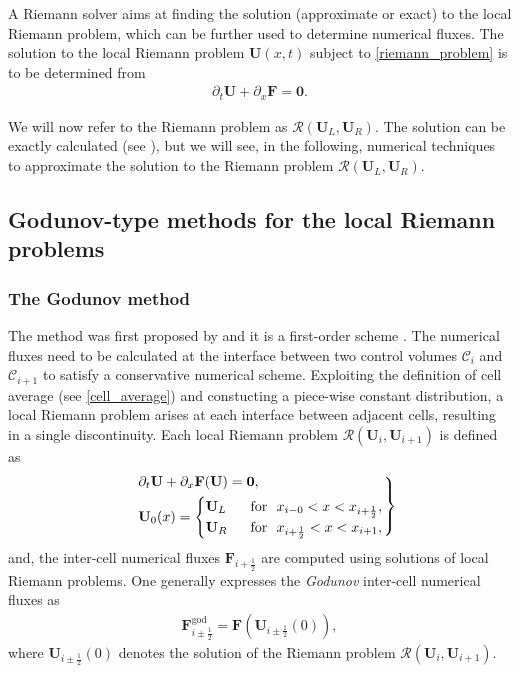 \documentclass[a4paper]{article}
\numberwithin{equation}{section}
\begin{document}
	A Riemann solver aims at finding the solution (approximate or exact) to the local Riemann problem, which can be further used to determine numerical fluxes. The solution to the local Riemann problem $\mathbf{U}(x,t)$ subject to \ref{riemann_problem} is to be determined from
	\begin{align}
		 \partial_t \mathbf{U}+\partial_x\mathbf{F} = \mathbf{0}.
	\end{align}
 
	We will now refer to the Riemann problem as $\mathcal{R}(\mathbf{U}_L,\mathbf{U}_R)$. The solution can be exactly calculated (see \cite{castro2019,toro2013,leveque_2002}), but we will see, in the following, numerical techniques to approximate the solution to the Riemann problem  $\mathcal{R}(\mathbf{U}_L,\mathbf{U}_R)$.

	\subsection{Godunov-type methods for the local Riemann problems}
	\subsubsection{The Godunov method}\label{godunov_method}
	The method was first proposed by \cite{godunov1959} and it is a first-order scheme \parencite{toro2013}. The numerical fluxes need to be calculated at the interface between two control volumes $\mathcal{C}_{i}$ and $\mathcal{C}_{i+1}$ to satisfy a conservative numerical scheme. Exploiting the definition of cell average (see \ref{cell_average}) and constucting a piece-wise constant distribution, a local Riemann problem arises at each interface between adjacent cells, resulting in a single discontinuity. Each local Riemann problem $\mathcal{R
	}(\mathbf{U}_{i},\mathbf{U}_{i+1})$ is defined as
	\begin{align}
		\begin{rcases}
			&\partial_t \mathbf{U}+\partial_x \mathbf{F(U)} = \mathbf{0},\\
			&\mathbf{U}_0(x)=
			\begin{cases}
				\mathbf{U}_L  &\,\,\,\, \mathrm{for} \,\,\,\, x_{i-0}<x<x_{i+\frac{1}{2}},\\
				\mathbf{U}_R  &\,\,\,\, \mathrm{for} \,\,\,\, x_{i+\frac{1}{2}}<x<x_{i+1},\\
			\end{cases}
		\end{rcases} 
	\end{align}
	and, the inter-cell numerical fluxes $\mathbf{F}_{i+\frac{1}{2}}$ are computed using solutions of local Riemann problems. One generally expresses the \textit{Godunov} inter-cell numerical fluxes as 
	\begin{align}
		\mathbf{F}_{i\pm\frac{1}{2}}^{\mathrm{god}} = \mathbf{F}(\mathbf{U}_{i\pm\frac{1}{2}}(0)),
	\end{align}
	where $\mathbf{U}_{i\pm\frac{1}{2}}(0)$ denotes the solution of the Riemann problem $\mathcal{R}(\mathbf{U}_{i},\mathbf{U}_{i+1})$. 
	
\end{document}
